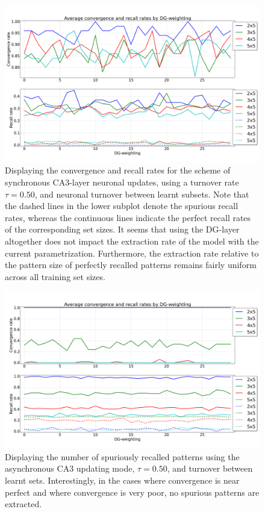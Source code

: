 \begin{figure}
    \centering
    \includegraphics[width=13cm]{fig/DGWs/sync_tm0_50}
    \caption{Displaying the convergence and recall rates for the scheme of synchronous CA3-layer neuronal updates, using a turnover rate $\tau=0.50$, and neuronal turnover between learnt subsets. Note that the dashed lines in the lower subplot denote the spurious recall rates, whereas the continuous lines indicate the perfect recall rates of the corresponding set sizes. It seems that using the DG-layer altogether does not impact the extraction rate of the model with the current parametrization. Furthermore, the extraction rate relative to the pattern size of perfectly recalled patterns remains fairly uniform across all training set sizes.}
    \label{fig:sync_tm0_50}
\end{figure}

\begin{figure}
    \centering
    \includegraphics[width=13cm]{fig/DGWs/async_tm0_50}
    \caption{Displaying the number of spuriously recalled patterns using the asynchronous CA3 updating mode, $\tau=0.50$, and turnover between learnt sets. Interestingly, in the cases where convergence is near perfect and where convergence is very poor, no spurious patterns are extracted.}
    \label{fig:async_tm0_50}
\end{figure}

